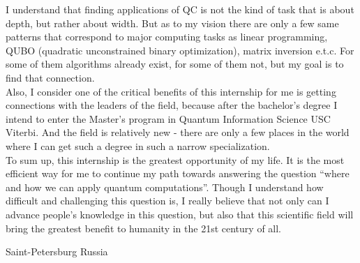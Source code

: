 \documentclass[11pt,a4paper,sans]{moderncv} %
\begin{document}
I understand that finding applications of QC is not the kind of task that is about depth, but rather about width. But as to my vision there are only a few same patterns that correspond to major computing tasks as linear programming, QUBO (quadratic unconstrained binary optimization), matrix inversion e.t.c. For some of them algorithms already exist, for some of them not, but my goal is to find that connection.\\
Also, I consider one of the critical benefits of this internship for me is getting connections with the leaders of the field, because after the bachelor's degree I intend to enter the Master's program in Quantum Information Science USC Viterbi. And the field is relatively new - there are only a few places in the world where I can get such a degree in such a narrow specialization. \\
To sum up, this internship is the greatest opportunity of my life. It is the most efficient way for me to continue my path towards answering the question “where and how we can apply quantum computations”. Though I understand how difficult and challenging this question is, I really believe that not only can I advance people’s knowledge in this question, but also that this scientific field will bring the greatest benefit to humanity in the 21st century of all.

\vspace*{\fill}
	\address{Novoizmailovsky prospect, 16k8}{Saint-Petersburg}{ Russia }
\makeletterclosing %
\name{}{}
\end{document}
